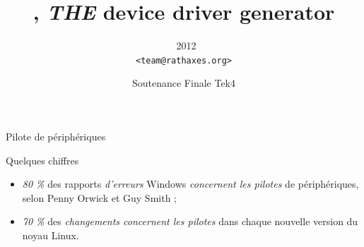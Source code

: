 \documentclass{beamer}
\title{\rtx, \emph{THE} device driver generator}
\date{Soutenance Finale Tek4}
\author{\rtx\ 2012 \\ \texttt{<team@rathaxes.org>}}
\newcommand{\cemph}[1]{{\itshape{\textcolor{rathaxesred}{#1}}}}
\begin{document}
\begin{frame}
\titlepage
\end{frame}

\begin{frame}{Pilote de périphériques}
\begin{center}


\end{center}
\end{frame}

\begin{frame}{Quelques chiffres}
\Large{
\begin{itemize}
\setlength{\itemsep}{1em}
\item {\LARGE \emph{80 \%}} des rapports \cemph{d'erreurs} Windows \cemph{concernent les pilotes} de périphériques, selon Penny Orwick et Guy Smith ;
\item {\LARGE \emph{70 \%}} des \cemph{changements concernent les pilotes} dans chaque nouvelle version du noyau Linux.
\end{itemize}
}
\end{frame}
\end{document}
